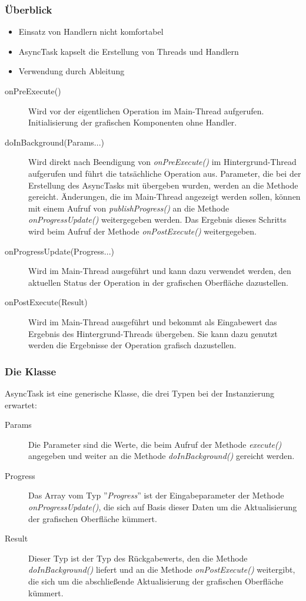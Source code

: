 \begin{frame}
   \frametitle{Überblick}
   \begin{itemize}
     	\item Einsatz von Handlern nicht komfortabel
     	\item AsyncTask kapselt die Erstellung von Threads und Handlern
     	\item Verwendung durch Ableitung
   \end{itemize}

	\begin{description}
		\item[onPreExecute()] Wird vor der eigentlichen 
			Operation im Main-Thread aufgerufen. Initialisierung der grafischen Komponenten 
			ohne Handler.
		\item[doInBackground(Params...)] Wird direkt nach Beendigung von \emph{onPreExecute()} 
			im Hintergrund-Thread aufgerufen und führt die tatsächliche Operation aus. 
			Parameter, die bei der Erstellung des AsyncTasks mit übergeben wurden, 
			werden an die Methode gereicht. Änderungen, die im Main-Thread angezeigt werden 
			sollen, können mit einem Aufruf von \emph{publishProgress()} an die Methode 
			\emph{onProgressUpdate()} weitergegeben werden. Das Ergebnis dieses Schritts wird beim Aufruf 
			der Methode \emph{onPostExecute()} weitergegeben.
		\item[onProgressUpdate(Progress...)] Wird im Main-Thread ausgeführt und 
			kann dazu verwendet werden, den aktuellen Status der Operation in der 
			grafischen Oberfläche dazustellen.
		\item[onPostExecute(Result)] Wird im Main-Thread ausgeführt und 
			bekommt als Eingabewert das Ergebnis des Hintergrund-Threads übergeben. Sie 
			kann dazu genutzt werden die Ergebnisse der Operation grafisch dazustellen.
	\end{description}
\end{frame}

\begin{frame}
   \frametitle{Die Klasse}

	AsyncTask ist eine generische Klasse, die drei Typen bei der 
	Instanzierung erwartet:

	\begin{description}
		\item[Params] Die Parameter sind die Werte, die beim Aufruf der Methode \emph{execute()} 
			angegeben und weiter an die Methode \emph{doInBackground()} gereicht werden.
		\item[Progress] Das Array vom Typ ''\emph{Progress}'' ist der Eingabeparameter der 
			Methode \emph{onProgressUpdate()}, die sich auf Basis dieser Daten um die 
			Aktualisierung der grafischen Oberfläche kümmert.
		\item[Result] Dieser Typ ist der Typ des Rückgabewerts, den die Methode 
			\emph{doInBackground()} liefert und an die Methode \emph{onPostExecute()} 
			weitergibt, die sich um die abschließende Aktualisierung der grafischen Oberfläche kümmert.
	\end{description}
\end{frame}

